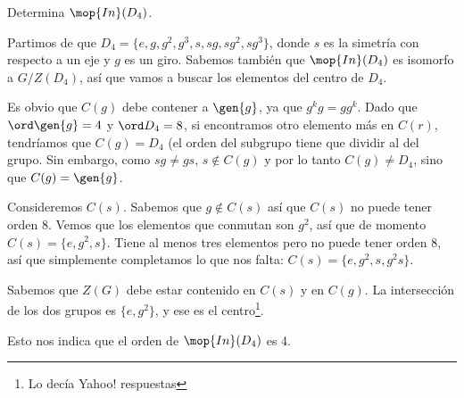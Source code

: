 \documentclass[nochap]{apuntes}
\begin{document}
\begin{problem}[4] Determina $\mop{In}(D_4)$.

\solution

Partimos de que $D_4 = \{ e, g, g^2, g^3, s, sg, sg^2, sg^3 \}$, donde $s$ es la simetría con respecto a un eje y $g$ es un giro. Sabemos también que $\mop{In}(D_4)$ es isomorfo a $G/Z(D_4)$, así que vamos a buscar los elementos del centro de $D_4$.

 Es obvio que $C(g)$ debe contener a $\gen{g}$, ya que $g^kg = g g^k$. Dado que $\ord \gen{g} = 4$ y $\ord D_4 = 8$, si encontramos otro elemento más en $C(r)$, tendríamos que $C(g) = D_4$ (el orden del subgrupo tiene que dividir al del grupo. Sin embargo, como $sg≠gs$, $s∉C(g)$ y por lo tanto $C(g)≠D_4$, sino que $C(g) = \gen{g}$.
 
 Consideremos $C(s)$. Sabemos que $g∉C(s)$ así que $C(s)$ no puede tener orden 8. Vemos que los elementos que conmutan son $g^2$, así que de momento $C(s) = \{e, g^2, s\}$. Tiene al menos tres elementos pero no puede tener orden 8, así que simplemente completamos lo que nos falta: $C(s) = \{ e, g^2, s, g^2s \}$.

 Sabemos que $Z(G)$ debe estar contenido en $C(s)$ y en $C(g)$. La intersección de los dos grupos es $\{e,g^2\}$, y ese es el centro\footnote{Lo decía Yahoo! respuestas}.
 
 Esto nos indica que el orden de $\mop{In}(D_4)$ es 4.

\end{problem}
\end{document}
